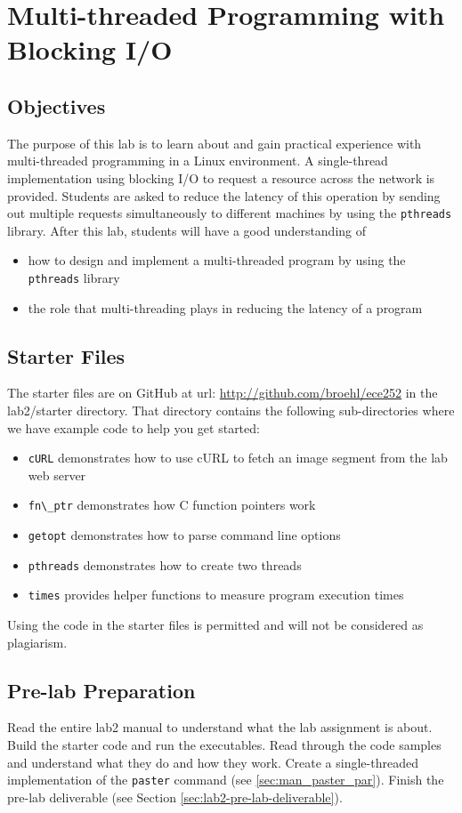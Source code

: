 \chapter{Multi-threaded Programming with Blocking I/O}
\label{ch2_pthreads}

\section{Objectives}
The purpose of this lab is to learn about and gain practical experience with multi-threaded programming in a Linux environment. A single-thread implementation using blocking I/O to request a resource across the network is provided. Students are asked to reduce the latency of this operation by sending out multiple requests simultaneously to different machines by using the \verb+pthreads+ library. After this lab, students will have a good understanding of
\begin{itemize}
  \item  how to design and implement a multi-threaded program by using the \verb+pthreads+ library
  \item  the role that multi-threading plays in reducing the latency of a program
\end{itemize}

\section{Starter Files}
The starter files are on GitHub at url: \url{http://github.com/broehl/ece252} in the lab2/starter directory.
That directory contains the following sub-directories where we have example code to help you get started:
\begin{itemize}
    \item \verb+cURL+ demonstrates how to use cURL to fetch an image segment from the lab web server
    \item \verb+fn\_ptr+ demonstrates how C function pointers work
    \item \verb+getopt+ demonstrates how to parse command line options
    \item \verb+pthreads+ demonstrates how to create two threads
    \item \verb+times+ provides helper functions to measure program execution times
\end{itemize}
Using the code in the starter files is permitted and will not be considered as plagiarism.

\section{Pre-lab Preparation}
Read the entire lab2 manual to understand what the lab assignment is about. Build the starter code and run the executables. Read through the code samples and understand what they do and how they work. Create a single-threaded implementation of the \verb+paster+ command (see \ref{sec:man_paster_par}).
Finish the pre-lab deliverable (see Section \ref{sec:lab2-pre-lab-deliverable}).

